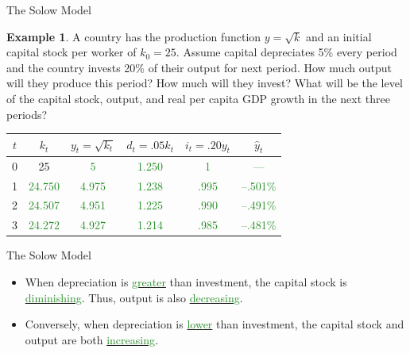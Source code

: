 \documentclass[xcolor={dvipsnames},pdf, hyperref={colorlinks=true, citecolor=ForestGreen, linkcolor=BlueViolet, urlcolor=Magenta}]{beamer}
\theoremstyle{definition}
\newtheorem{exmp}{Example}[section]
\newcommand{\ddp}[1]{{\textcolor{ForestGreen}{#1}}}
\newcommand{\dd}[1]{{\underline{\textcolor{ForestGreen}{#1}}}}
\begin{document}
\begin{frame}{The Solow Model}
\begin{exmp} 
	A country has the production function $y = \sqrt{k}$ and an initial capital stock per worker of $k_0 = 25$. Assume capital depreciates 5\% every period and the country invests 20\% of their output for next period. How much output will they produce this period? How much will they invest? What will be the level of the capital stock, output, and real per capita GDP growth in the next three periods?
\end{exmp}
\begin{table}[ht]
	\centering
	\begin{tabular}{c|c|c|c|c|c}        
		
		$t$ & $k_t$ & $y_t = \sqrt{k_t}$ & $d_t = .05k_t$ & $i_t = .20y_t$ & $\hat{y}_t$ \\
		\hline
		0 & 25 & \ddp{5} & \ddp{1.250} & \ddp{1} & \ddp{---} \\
		1 & \ddp{24.750} & \ddp{4.975} & \ddp{1.238} & \ddp{.995} & \ddp{--.501\%}\\
		2 & \ddp{24.507} & \ddp{4.951} & \ddp{1.225} & \ddp{.990} & \ddp{--.491\%}\\
		3 & \ddp{24.272} & \ddp{4.927} & \ddp{1.214} & \ddp{.985} & \ddp{--.481\%} \\
		
	\end{tabular}
\end{table}
\end{frame}

\begin{frame}{The Solow Model}
\begin{itemize}
	\item When depreciation is \dd{greater} than investment, the capital stock is \dd{diminishing}. Thus, output is also \dd{decreasing}.
	\item Conversely, when depreciation is \dd{lower} than investment, the capital stock and output are both \dd{increasing}.
\end{itemize}
\end{frame}
\end{document}
